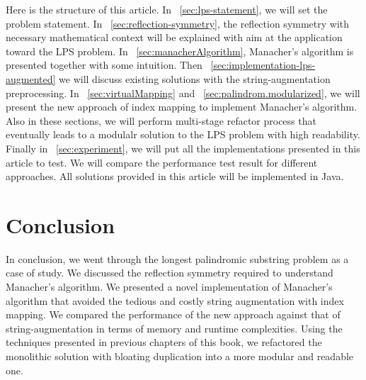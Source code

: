 \documentclass[a4paper,titlepage]{article}
\begin{document}
    Here is the structure of this article.
    In ~\autoref{sec:lps-statement}, we will set the problem statement.
    In ~\autoref{sec:reflection-symmetry}, the reflection symmetry with necessary
    mathematical context will be explained with aim at the application toward the LPS problem.
    In ~\autoref{sec:manacherAlgorithm}, Manacher's algorithm is presented together with some
    intuition.
    Then ~\autoref{sec:implementation-lps-augmented} we will discuss existing solutions
    with the string-augmentation preprocessing.
    In ~\autoref{sec:virtualMapping} and ~\autoref{sec:palindrom.modularized},
    we will present the new approach of index mapping to implement Manacher's algorithm.
    Also in these sections, we will perform multi-stage refactor process that eventually leads to
    a modulalr solution to the LPS problem with high readability.
    Finally in ~\autoref{sec:experiment}, we will put all the implementations presented in this
    article to test.
    We will compare the performance test result for different approaches.
    All solutions provided in this article will be implemented in Java.


    
    

    \section{Conclusion}\label{sec:conclusion}

    In conclusion, we went through the longest palindromic substring
    problem as a case of study.
    We discussed the reflection symmetry required to understand Manacher's algorithm.
    We presented a novel implementation of Manacher's algorithm that avoided the tedious and
    costly string augmentation with index mapping.
    We compared the performance of the new approach against that of string-augmentation in
    terms of memory and runtime complexities.
    Using the techniques presented in previous chapters of this book, we refactored the monolithic
    solution with bloating duplication into a more modular and readable one.
    
    
\end{document}
